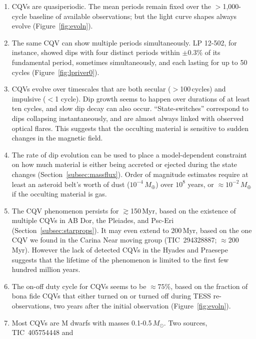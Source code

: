 \documentclass[11pt,twocolumn,tighten]{aastex63}
\begin{document}
\begin{enumerate}[leftmargin=*]
    \item CQVs are quasiperiodic.  The mean periods remain fixed over
      the $>$1{,}000-cycle baseline of available observations; but the
      light curve shapes always evolve (Figure~\ref{fig:evoln}).
    \item The same CQV can show multiple periods simultaneously.  LP
      12-502, for instance, showed dips with four distinct periods
      within $\pm 0.3\%$ of its fundamental period, sometimes
      simultaneously, and each lasting for up to 50 cycles
      (Figure~\ref{fig:lpriver0}).
    \item CQVs evolve over timescales that are both secular
      ($>$100\,cycles) and impulsive ($<$1 cycle).  Dip growth seems
      to happen over durations of at least ten cycles, and slow dip
      decay can also occur.  ``State-switches'' correspond to dips 
      collapsing instantaneously, and are almost always linked with
      observed optical flares.  This suggests that the occulting
      material is sensitive to sudden changes in the magnetic field.
    \item The rate of dip evolution can be used to place a
      model-dependent constraint on how much material is either being
      accreted or ejected during the state changes
      (Section~\ref{subsec:massflux}).  Order of magnitude estimates
      require at least an asteroid belt's worth of dust
      ($10^{-4}$\,$M_\oplus$) over $10^8$ years, or
      $\approx$$10^{-2}$\,$M_\oplus$ if the occulting material is gas.
    \item The CQV phenomenon persists for $\gtrsim$150\,Myr, based on
      the existence of multiple CQVs in AB Dor, the Pleiades, and
      Psc-Eri (Section~\ref{subsec:starprops}).  It may even extend to
      200\,Myr, based on the one CQV we found in the Carina Near
      moving group (TIC~294328887; $\approx$200\,Myr).  However the
      lack of detected CQVs in the Hyades and Praesepe suggests that
      the lifetime of the phenomenon is limited to the first few
      hundred million years.
    \item The on-off duty cycle for CQVs seems to be $\approx$$75$\%, based
      on the fraction of bona fide CQVs that either turned on or turned
      off during TESS re-observations, two years after the initial
      observation (Figure~\ref{fig:evoln}).
    \item Most CQVs are M dwarfs with masses
      0.1-0.5\,$M_\odot$.  Two sources, TIC~405754448 and

\end{enumerate}
\end{document}
